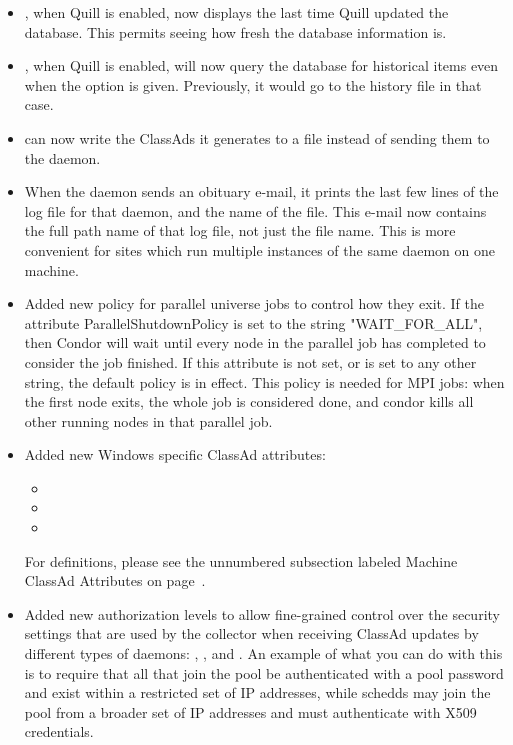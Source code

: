 \begin{itemize}

\item {}, when Quill is enabled, now displays the last time
Quill updated the database.  This permits seeing how fresh
the database information is.

\item {}, when Quill is enabled, will now query the
database for historical items even when the  option
is given.  Previously, it would go to the history file in that case.

\item {} can now write the ClassAds it generates to a
file instead of sending them to the  daemon.

\item When the  daemon sends an obituary e-mail,
it prints the last few lines of the log file for that daemon,
and the name of the file.
This e-mail now contains the full path name of that log file,
not just the file name.  This is more convenient for sites which
run multiple instances of the same daemon on one machine.

\item Added new policy for parallel universe jobs to control how they
exit.  If the attribute ParallelShutdownPolicy is set to the string
"WAIT\_FOR\_ALL", then Condor will wait until every node in the parallel
job has completed to consider the job finished.  If this attribute is
not set, or is set to any other string, the default policy is in effect.
This policy is needed for MPI jobs: when the first node exits, the whole
job is considered done, and condor kills all other running nodes in that
parallel job.

\item Added new Windows specific ClassAd attributes:
 \begin{itemize}
 \item {}
 \item {}
 \item {}
 \end{itemize}
For definitions, please see 
the unnumbered subsection labeled Machine ClassAd Attributes
on page~\pageref{sec:Machine-ClassAd-Attributes}.

\item Added new authorization levels to allow fine-grained control
over the security settings that are used by the collector when
receiving ClassAd updates by different types of daemons:
, , and
.  An example of what you can do with this
is to require that all  that join the pool be
authenticated with a pool password and exist within a restricted set
of IP addresses, while schedds may join the pool from a broader set
of IP addresses and must authenticate with X509 credentials.


\end{itemize}

